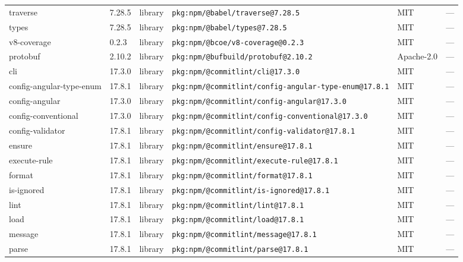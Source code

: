 \documentclass[11pt,a4paper]{article}
\begin{document}
\begin{longtable}{|p{4cm}|p{2cm}|p{1.6cm}|p{5cm}|p{1.5cm}|p{3.5cm}|}
\raggedright traverse & 7.28.5 & library & \small\texttt{pkg:npm/@babel/traverse@7.28.5} & MIT & \small — \\
\raggedright types & 7.28.5 & library & \small\texttt{pkg:npm/@babel/types@7.28.5} & MIT & \small — \\
\raggedright v8-coverage & 0.2.3 & library & \small\texttt{pkg:npm/@bcoe/v8-coverage@0.2.3} & MIT & \small — \\
\raggedright protobuf & 2.10.2 & library & \small\texttt{pkg:npm/@bufbuild/protobuf@2.10.2} & Apache-2.0 & \small — \\
\raggedright cli & 17.3.0 & library & \small\texttt{pkg:npm/@commitlint/cli@17.3.0} & MIT & \small — \\
\raggedright config-angular-type-enum & 17.8.1 & library & \small\texttt{pkg:npm/@commitlint/config-angular-type-enum@17.8.1} & MIT & \small — \\
\raggedright config-angular & 17.3.0 & library & \small\texttt{pkg:npm/@commitlint/config-angular@17.3.0} & MIT & \small — \\
\raggedright config-conventional & 17.3.0 & library & \small\texttt{pkg:npm/@commitlint/config-conventional@17.3.0} & MIT & \small — \\
\raggedright config-validator & 17.8.1 & library & \small\texttt{pkg:npm/@commitlint/config-validator@17.8.1} & MIT & \small — \\
\raggedright ensure & 17.8.1 & library & \small\texttt{pkg:npm/@commitlint/ensure@17.8.1} & MIT & \small — \\
\raggedright execute-rule & 17.8.1 & library & \small\texttt{pkg:npm/@commitlint/execute-rule@17.8.1} & MIT & \small — \\
\raggedright format & 17.8.1 & library & \small\texttt{pkg:npm/@commitlint/format@17.8.1} & MIT & \small — \\
\raggedright is-ignored & 17.8.1 & library & \small\texttt{pkg:npm/@commitlint/is-ignored@17.8.1} & MIT & \small — \\
\raggedright lint & 17.8.1 & library & \small\texttt{pkg:npm/@commitlint/lint@17.8.1} & MIT & \small — \\
\raggedright load & 17.8.1 & library & \small\texttt{pkg:npm/@commitlint/load@17.8.1} & MIT & \small — \\
\raggedright message & 17.8.1 & library & \small\texttt{pkg:npm/@commitlint/message@17.8.1} & MIT & \small — \\
\raggedright parse & 17.8.1 & library & \small\texttt{pkg:npm/@commitlint/parse@17.8.1} & MIT & \small — \\

\end{longtable}
\end{document}

